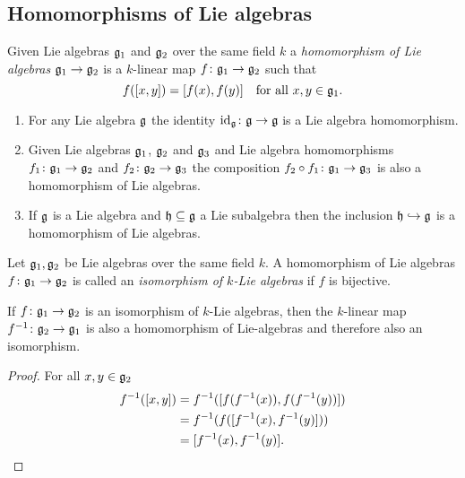 \subsection{Homomorphisms of Lie algebras}


\begin{defi}
 Given Lie algebras $\mathfrak{g}_1$ and $\mathfrak{g}_2$ over the same field $k$ a \emph{homomorphism of Lie algebras} $\mathfrak{g}_1 \to \mathfrak{g}_2$ is a $k$-linear map $f \colon \mathfrak{g}_1 \to \mathfrak{g}_2$ such that
 \[
  f([x,y]) =[f(x),f(y)] \quad \text{for all $x,y \in \mathfrak{g}_1$}.
 \]
\end{defi}


\begin{expls}
 \begin{enumerate}[leftmargin=*]
  \item
   For any Lie algebra $\mathfrak{g}$ the identity $\operatorname{id}_{\mathfrak{g}} \colon \mathfrak{g} \to \mathfrak{g}$ is a Lie algebra homomorphism.
  \item
   Given Lie algebras $\mathfrak{g}_1$, $\mathfrak{g}_2$ and $\mathfrak{g}_3$ and Lie algebra homomorphisms $f_1 \colon \mathfrak{g}_1 \to \mathfrak{g}_2$ and $f_2 \colon \mathfrak{g}_2 \to \mathfrak{g}_3$ the composition $f_2 \circ f_1 \colon \mathfrak{g}_1 \to \mathfrak{g}_3$ is also a homomorphism of Lie algebras.
  \item
   If $\mathfrak{g}$ is a Lie algebra and $\mathfrak{h} \subseteq \mathfrak{g}$ a Lie subalgebra then the inclusion $\mathfrak{h} \hookrightarrow \mathfrak{g}$ is a homomorphism of Lie algebras.
 \end{enumerate}
\end{expls}


\begin{defi}
 Let $\mathfrak{g}_1, \mathfrak{g}_2$ be Lie algebras over the same field $k$. A homomorphism of Lie algebras $f \colon \mathfrak{g}_1 \to \mathfrak{g}_2$ is called an \emph{isomorphism of $k$-Lie algebras} if $f$ is bijective.
\end{defi}


\begin{lem}
 If $f \colon \mathfrak{g}_1 \to \mathfrak{g}_2$ is an isomorphism of $k$-Lie algebras, then the $k$-linear map $f^{-1} \colon \mathfrak{g}_2 \to \mathfrak{g}_1$ is also a homomorphism of Lie-algebras and therefore also an isomorphism.
\end{lem}
\begin{proof}
 For all $x,y \in \mathfrak{g}_2$
 \begin{align*}
  f^{-1}( [x,y] )
  &= f^{-1}( [ f(f^{-1}(x)), f(f^{-1}(y)) ] ) \\
  &= f^{-1}(f( [f^{-1}(x) , f^{-1}(y)] )) \\
  &= [f^{-1}(x), f^{-1}(y)].
 \qedhere
 \end{align*}
\end{proof}


